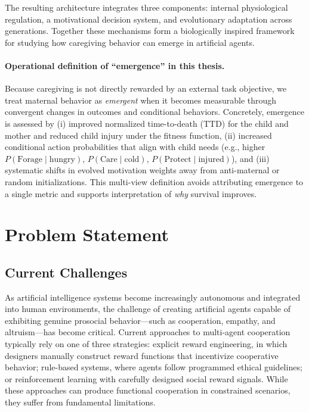 The resulting architecture integrates three components: internal physiological regulation, a motivational decision system, and evolutionary adaptation across generations. Together these mechanisms form a biologically inspired framework for studying how caregiving behavior can emerge in artificial agents.

\paragraph{Operational definition of ``emergence'' in this thesis.}
Because caregiving is not directly rewarded by an external task objective, we treat maternal behavior as \emph{emergent} when it becomes measurable through convergent changes in outcomes and conditional behaviors. Concretely, emergence is assessed by (i) improved normalized time-to-death (TTD) for the child and mother and reduced child injury under the fitness function, (ii) increased conditional action probabilities that align with child needs (e.g., higher $P(\text{Forage}\mid\text{hungry})$, $P(\text{Care}\mid\text{cold})$, $P(\text{Protect}\mid\text{injured})$), and (iii) systematic shifts in evolved motivation weights away from anti-maternal or random initializations. This multi-view definition avoids attributing emergence to a single metric and supports interpretation of \emph{why} survival improves.



\section{Problem Statement}

\subsection{Current Challenges}

As artificial intelligence systems become increasingly autonomous and integrated into human environments, the challenge of creating artificial agents capable of exhibiting genuine prosocial behavior—such as cooperation, empathy, and altruism—has become critical. Current approaches to multi-agent cooperation typically rely on one of three strategies: explicit reward engineering, in which designers manually construct reward functions that incentivize cooperative behavior; rule-based systems, where agents follow programmed ethical guidelines; or reinforcement learning with carefully designed social reward signals. While these approaches can produce functional cooperation in constrained scenarios, they suffer from fundamental limitations.

